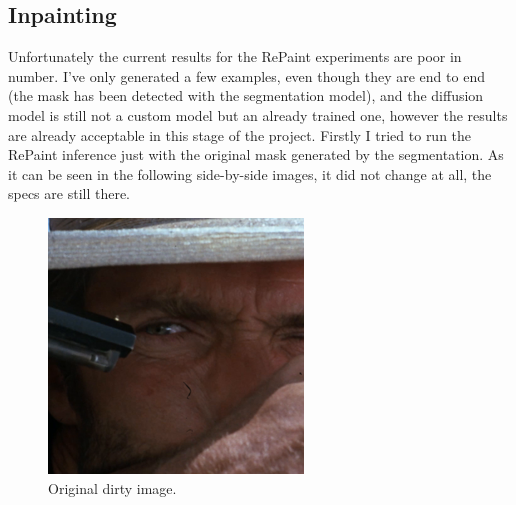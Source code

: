\documentclass[openany, 12pt]{article}
\begin{document}
{\subsection{Inpainting}
Unfortunately the current results for the RePaint experiments are poor in number. I've only generated a few examples, even though they are end to end (the mask has been detected with the segmentation model), and the diffusion model is still not a custom model but an already trained one, however the results are already acceptable in this stage of the project. Firstly I tried to run the RePaint inference just with the original mask generated by the segmentation. As it can be seen in the following side-by-side images, it did not change at all, the specs are still there. 
\begin{figure}[htbp]
	\centering
	\begin{minipage}{0.45\textwidth}
		\centering
		\includegraphics[width=\textwidth]{images/gt_image.png}
		\caption{Original dirty image. }
	\end{minipage}
	\hspace{0.05\textwidth}
	\begin{minipage}{0.45\textwidth}
		\centering

\end{minipage}
\end{figure}}
\end{document}
